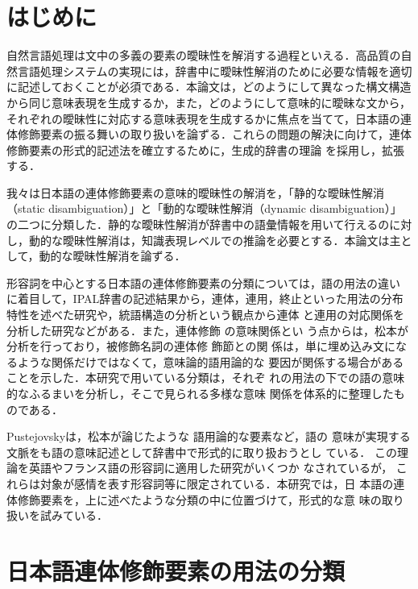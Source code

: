 \section{はじめに}
\label{sec:Introduction}

自然言語処理は文中の多義の要素の曖昧性を解消する過程といえる．高品質の自
然言語処理システムの実現には，辞書中に曖昧性解消のために必要な情報を適切
に記述しておくことが必須である．本論文は，どのようにして異なった構文構造
から同じ意味表現を生成するか，また，どのようにして意味的に曖昧な文から，
それぞれの曖昧性に対応する意味表現を生成するかに焦点を当てて，日本語の連
体修飾要素の振る舞いの取り扱いを論ずる．これらの問題の解決に向けて，連体
修飾要素の形式的記述法を確立するために，生成的辞書の理論
\cite{Pustejovsky95,Bouillon96}を採用し，拡張する\cite{Isahara99}．

我々は日本語の連体修飾要素の意味的曖昧性の解消を，「静的な曖昧性解消
（static disambiguation）」と「動的な曖昧性解消（dynamic disambiguation）」 
の二つに分類した．静的な曖昧性解消が辞書中の語彙情報を用いて行えるのに対
し，動的な曖昧性解消は，知識表現レベルでの推論を必要とする．本論文は主と
して，動的な曖昧性解消を論ずる． 

形容詞を中心とする日本語の連体修飾要素の分類については，語の用法の違い
に着目して，IPAL辞書の記述結果から，連体，連用，終止といった用法の分布
特性を述べた研究\cite{Hashimoto92j}や，統語構造の分析という観点から連体
と連用の対応関係を分析した研究\cite{Okutsu97}などがある．また，連体修飾
の意味関係とい
う点からは，松本が分析を行って\cite{matsumoto93j}おり，被修飾名詞の連体修
飾節との関
係は，単に埋め込み文になるような関係だけではなくて，意味論的語用論的な
要因が関係する場合があることを示した．本研究で用いている分類は，それぞ
れの用法の下での語の意味的なふるまいを分析し，そこで見られる多様な意味
関係を体系的に整理したものである\cite{Kanzaki99}． 

Pustejovskyは，松本が論じたような
語用論的な要素など，語の
意味が実現する文脈をも語の意味記述として辞書中で形式的に取り扱おうとし
ている\cite{Pustejovsky95}．
この理論を英語やフランス語の形容詞に適用した研究がいくつか
なされている\cite{Bouillon96,Bouillon99,Saint98}が，
これらは対象が感情を表す形容詞等に限定されている．本研究では，日
本語の連体修飾要素を，上に述べたような分類の中に位置づけて，形式的な意
味の取り扱いを試みている．



\section{日本語連体修飾要素の用法の分類}
\label{sec:classification}

